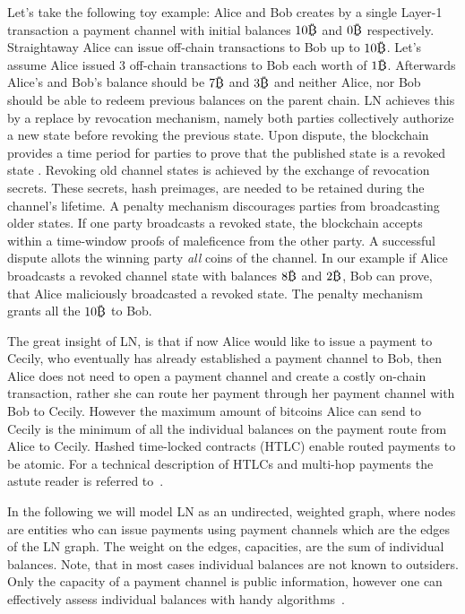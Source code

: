 \documentclass[runningheads]{llncs}
\def\bitcoinA{%
	\leavevmode
	\vtop{\offinterlineskip %
		\setbox0=\hbox{B}%
		\setbox2=\hbox to\wd0{\hfil\hskip-.03em
			\vrule height .3ex width .15ex\hskip .08em
			\vrule height .3ex width .15ex\hfil}
		\vbox{\copy2\box0}\box2}}
\begin{document}
Let's take the following toy example: Alice and Bob creates by a single Layer-1 transaction a payment channel with initial balances $10\bitcoinA$ and $0\bitcoinA$ respectively. Straightaway Alice can issue off-chain transactions to Bob up to $10\bitcoinA$. Let's assume Alice issued $3$ off-chain transactions to Bob each worth of $1\bitcoinA$. Afterwards Alice's and Bob's balance should be $7\bitcoinA$ and $3\bitcoinA$ and neither Alice, nor Bob should be able to redeem previous balances on the parent chain. LN achieves this by a replace by revocation mechanism, namely both parties collectively
authorize a new state before revoking the previous state.
Upon dispute, the blockchain provides a time period for
parties to prove that the published state is a revoked state \cite{cryptoeprint:2019:360}. Revoking old channel states is achieved by the exchange of revocation secrets. These secrets, hash preimages, are needed to be retained during the channel's lifetime. A penalty mechanism
discourages parties from broadcasting older states. If one party
broadcasts a revoked state, the blockchain accepts within a
time-window proofs of maleficence from the other party. A
successful dispute allots the winning party \textit{all} coins of the
channel. In our example if Alice broadcasts a revoked channel state with balances $8\bitcoinA$ and $2\bitcoinA$, Bob can prove, that Alice maliciously broadcasted a revoked state. The penalty mechanism grants all the $10\bitcoinA$ to Bob.

The great insight of LN, is that if now Alice would like to issue a payment to Cecily, who eventually has already established a payment channel to Bob, then Alice does not need to open a payment channel and create a costly on-chain transaction, rather she can route her payment through her payment channel with Bob to Cecily. However the maximum amount of bitcoins Alice can send to Cecily is the minimum of all the individual balances on the payment route from Alice to Cecily. Hashed time-locked contracts (HTLC) enable routed payments to be atomic. For a technical description of HTLCs and multi-hop payments the astute reader is referred to~\cite{poon2016bitcoin}. 

In the following we will model LN as an undirected, weighted graph, where nodes are entities who can issue payments using payment channels which are the edges of the LN graph. The weight on the edges, capacities, are the sum of individual balances. Note, that in most cases individual balances are not known to outsiders. Only the capacity of a payment channel is public information, however one can effectively assess individual balances with handy algorithms~\cite{cryptoeprint:2019:328}. 
\end{document}
